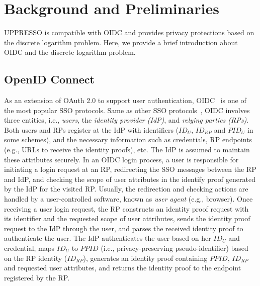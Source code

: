 \section{Background and Preliminaries}
\label{sec:background}
UPPRESSO is compatible with OIDC and provides privacy protections based on the discrete logarithm problem.
Here, we provide a brief introduction about OIDC and the discrete logarithm problem.

\subsection{OpenID Connect}
\label{subsec:OIDC}
As an extension of OAuth 2.0 to support user authentication, OIDC~\cite{OpenIDConnect} is one of the most popular SSO protocols.
Same as other SSO protocols~\cite{SAMLIdentifier}, OIDC involves three entities, i.e., {\em users}, the {\em identity provider (IdP)}, and {\em relying parties (RPs)}.
Both users and RPs register at the IdP with identifiers ($ID_U$, $ID_{RP}$ and $PID_U$ in some schemes),
   and the necessary information such as credentials, RP endpoints (e.g., URLs to receive the identity proofs), etc.
The IdP is assumed to maintain these attributes securely.
In an OIDC login process, a user is responsible for initiating a login request at an RP, redirecting the SSO messages between the RP and IdP, and checking the scope of user attributes in the identify proof generated by the IdP for the visited RP.
Usually, the redirection and checking actions are handled by a user-controlled software,
 known as {\em user agent} (e.g., browser).
Once receiving a user login request, the RP constructs an identity proof request with its identifier and the requested scope of user attributes,
 sends the identity proof request to the IdP through the user, and parses the received identity proof to authenticate the user.
The IdP authenticates the user based on her $ID_U$ and credential,
 maps $ID_U$ to $PPID$ (i.e., privacy-preserving pseudo-identifier) based on the RP identity ($ID_{RP}$),
 generates an identity proof containing $PPID$, $ID_{RP}$ and requested user attributes,
  and returns the identity proof to the endpoint registered by the RP.

